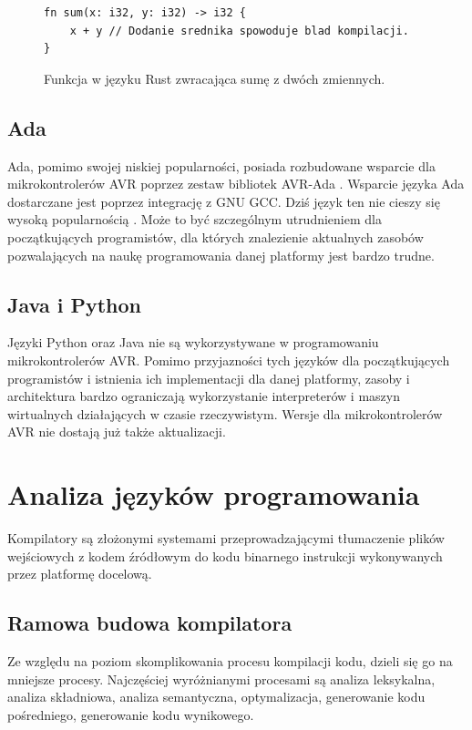 \begin{figure}
\begin{lstlisting}
fn sum(x: i32, y: i32) -> i32 {
	x + y // Dodanie srednika spowoduje blad kompilacji.
}
\end{lstlisting}
\caption{Funkcja w języku Rust zwracająca sumę z dwóch zmiennych.}
\label{fig:lst:rust-fn}
\end{figure}

\subsection{Ada}
Ada, pomimo swojej niskiej popularności, posiada rozbudowane wsparcie dla mikrokontrolerów AVR poprzez zestaw bibliotek AVR-Ada \cite{AVRAdaWikiHome}. Wsparcie języka Ada dostarczane jest poprzez integrację z GNU GCC. Dziś język ten nie cieszy się wysoką popularnością \cite{SOBRAL201930Y}. Może to być szczególnym utrudnieniem dla początkujących programistów, dla których znalezienie aktualnych zasobów pozwalających na naukę programowania danej platformy jest bardzo trudne.
\subsection{Java i Python}
Języki Python oraz Java nie są wykorzystywane w programowaniu mikrokontrolerów AVR. Pomimo przyjazności tych języków dla początkujących programistów i istnienia ich implementacji dla danej platformy, zasoby i architektura bardzo ograniczają wykorzystanie interpreterów i maszyn wirtualnych działających w czasie rzeczywistym. Wersje dla mikrokontrolerów AVR nie dostają już także aktualizacji.

\section{Analiza języków programowania}
Kompilatory są złożonymi systemami przeprowadzającymi tłumaczenie plików wejściowych z kodem źródłowym do kodu binarnego instrukcji wykonywanych przez platformę docelową.

\subsection{Ramowa budowa kompilatora}
Ze względu na poziom skomplikowania procesu kompilacji kodu, dzieli się go na mniejsze procesy. Najczęściej wyróżnianymi procesami są analiza leksykalna, analiza składniowa, analiza semantyczna, optymalizacja, generowanie kodu pośredniego, generowanie kodu wynikowego.
